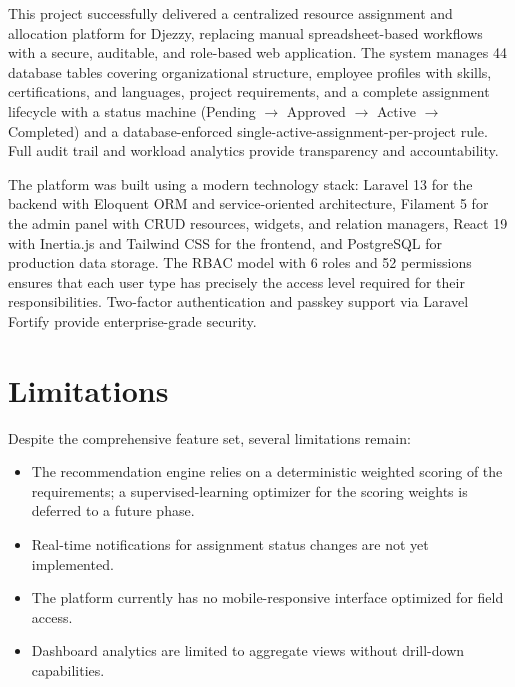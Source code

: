 \documentclass{bts-report}
\begin{document}
This project successfully delivered a centralized resource assignment and allocation platform for Djezzy, replacing manual spreadsheet-based workflows with a secure, auditable, and role-based web application. The system manages 44 database tables covering organizational structure, employee profiles with skills, certifications, and languages, project requirements, and a complete assignment lifecycle with a status machine (Pending $\rightarrow$ Approved $\rightarrow$ Active $\rightarrow$ Completed) and a database-enforced single-active-assignment-per-project rule. Full audit trail and workload analytics provide transparency and accountability.

The platform was built using a modern technology stack: Laravel 13 for the backend with Eloquent ORM and service-oriented architecture, Filament 5 for the admin panel with CRUD resources, widgets, and relation managers, React 19 with Inertia.js and Tailwind CSS for the frontend, and PostgreSQL for production data storage. The RBAC model with 6 roles and 52 permissions ensures that each user type has precisely the access level required for their responsibilities. Two-factor authentication and passkey support via Laravel Fortify provide enterprise-grade security.

\section{Limitations}
Despite the comprehensive feature set, several limitations remain:
\begin{itemize}
  \item The recommendation engine relies on a deterministic weighted scoring of the requirements; a supervised-learning optimizer for the scoring weights is deferred to a future phase.
  \item Real-time notifications for assignment status changes are not yet implemented.
  \item The platform currently has no mobile-responsive interface optimized for field access.
  \item Dashboard analytics are limited to aggregate views without drill-down capabilities.
\end{itemize}
\end{document}
